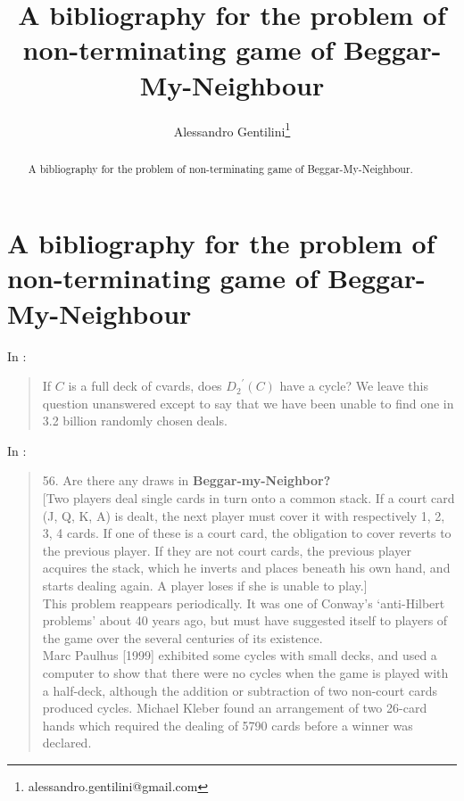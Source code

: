\documentclass[a4paper,12pt]{article}
\title{A bibliography for the problem of non-terminating game of Beggar-My-Neighbour}
\author{Alessandro Gentilini\thanks{alessandro.gentilini@gmail.com}}
\begin{document}
\maketitle

\begin{abstract}
A bibliography for the problem of non-terminating game of Beggar-My-Neighbour.
\end{abstract} 

\section{A bibliography for the problem of non-terminating game of Beggar-My-Neighbour}

In \cite[p.164]{paulhus1999beggar}:
\begin{quotation}
If $C$ is a full deck of cvards, does ${D_{2}}^{'}(C)$ have a cycle? We leave this question unanswered except to say that we have been unable to find one in 3.2 billion randomly chosen deals.
\end{quotation}

In \cite[p.472]{nowakowski2002more}:
\begin{quotation}
56. Are there any draws in \textbf{Beggar-my-Neighbor?}\\ 

[Two players deal single cards in turn onto a common stack. If a court card (J,
Q, K, A) is dealt, the next player must cover it with respectively 1, 2, 3, 4 cards. If one of these is a court card, the obligation to cover reverts to the previous player. If they are not court cards, the previous player acquires the stack, which he inverts and places beneath his own hand, and starts dealing again. A player loses if she is unable to play.]\\

This problem reappears periodically. It was one of Conway’s ‘anti-Hilbert problems’ about 40 years ago, but must have suggested itself to players of the game over the several centuries of its existence.\\

Marc Paulhus [1999] exhibited some cycles with small decks, and used a computer to show that there were no cycles when the game is played with a half-deck, although the addition or subtraction of two non-court cards produced cycles. Michael Kleber found an arrangement of two 26-card hands which required the dealing of 5790 cards before a winner was declared.
\end{quotation}
\end{document}
